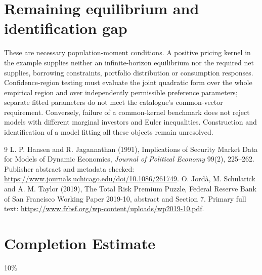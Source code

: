 \documentclass[11pt]{article}
\theoremstyle{definition}
\begin{document}
\section*{Remaining equilibrium and identification gap}
These are necessary population-moment conditions. A positive pricing kernel in the example supplies neither an infinite-horizon equilibrium nor the required net supplies, borrowing constraints, portfolio distribution or consumption responses. Confidence-region testing must evaluate the joint quadratic form over the whole empirical region and over independently permissible preference parameters; separate fitted parameters do not meet the catalogue's common-vector requirement. Conversely, failure of a common-kernel benchmark does not reject models with different marginal investors and Euler inequalities. Construction and identification of a model fitting all these objects remain unresolved.
\begin{thebibliography}{9}
 L. P. Hansen and R. Jagannathan (1991), Implications of Security Market Data for Models of Dynamic Economies, \emph{Journal of Political Economy} 99(2), 225--262. Publisher abstract and metadata checked: \url{https://www.journals.uchicago.edu/doi/10.1086/261749}.
 O. Jord\`a, M. Schularick and A. M. Taylor (2019), The Total Risk Premium Puzzle, Federal Reserve Bank of San Francisco Working Paper 2019-10, abstract and Section 7. Primary full text: \url{https://www.frbsf.org/wp-content/uploads/wp2019-10.pdf}.
\end{thebibliography}

\section{Completion Estimate}
10\%
\end{document}

